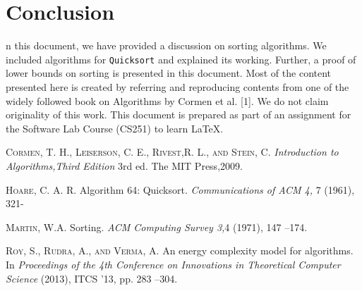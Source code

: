 \documentclass[a4paper,10pt,twocolumn]{article}
\begin{document}
\section{Conclusion}
n this document, we have provided a discussion
on sorting algorithms. We included algorithms for
\texttt{Quicksort} and explained its working. Further, a
proof of lower bounds on sorting is presented in this
document. Most of the content presented here is
created by referring and reproducing contents from
one of the widely followed book on Algorithms by Cormen et al. [1]. We do not claim originality of
this work. This document is prepared as part of an
assignment for the Software Lab Course (CS251) to
learn \LaTeX.
\begin{thebibliography}{25}
\textsc{Cormen, T. H., Leiserson, C. E., Rivest,R. L., and Stein, C.}
 \textit{Introduction to Algorithms,Third Edition}
3rd ed. The MIT Press,2009.
 
\textsc{Hoare, C. A. R.}
 Algorithm 64: Quicksort.
 \textit{Communications of ACM 4,} 7 (1961), 321-
 
\textsc{Martin, W.A.}
 Sorting.
 \textit{ACM Computing
Survey 3,}4 (1971), 147 –174.
 
 
\textsc{Roy, S., Rudra, A., and Verma, A.}
 An energy complexity model for algorithms. In
 \textit{Proceedings of the 4th Conference on Innovations in Theoretical Computer Science} (2013), ITCS ’13, pp. 283 –304.
 
 \end{thebibliography}
\end{document}
